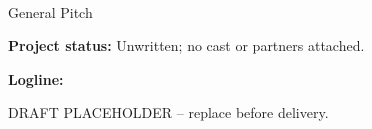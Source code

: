 \documentclass[11pt,letterpaper]{article}
\begin{document}
\begin{center}
{\Large\bfseries\sffamily \filmtitleupper}\\[6pt]
General Pitch
\end{center}
\textbf{Project status:} Unwritten; no cast or partners attached.

\textbf{Logline:} \filmlogline

DRAFT PLACEHOLDER -- replace before delivery.
\end{document}
